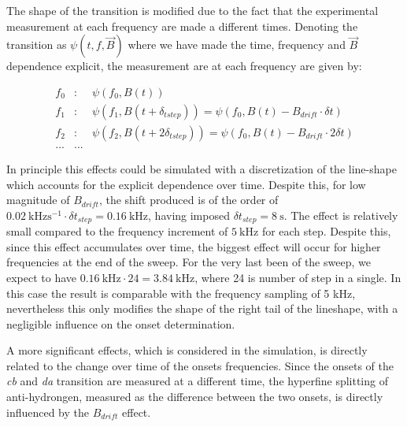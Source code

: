\documentclass[11pt,a4paper,oneside]{article}
\begin{document}
The shape of the transition  is modified due to the fact that the experimental measurement at each frequency are made a different times. Denoting the transition as $\psi(t,f,\vec{B})$ where we have made the time, frequency and $\vec{B}$ dependence explicit, the measurement are at each frequency are given by:

\begin{eqnarray*}
f_{0}& : &\psi(f_{0},B(t))   \\
f_{1}& : &\psi(f_{1},B(t + \delta_{tstep})) = \psi(f_{0},B(t) - B_{drift} \cdot \delta t) \\
f_{2}& : &\psi(f_{2},B(t + 2\delta_{tstep})) = \psi(f_{0},B(t) - B_{drift} \cdot 2 \delta t)\\
... & ...
\end{eqnarray*}

In principle this effects could be simulated with a discretization of the line-shape which accounts for the explicit dependence over time. Despite this, for low magnitude of $B_{drift}$, the shift produced is of the order of $\SI{0.02}{\kilo \hertz \second \tothe{-1}} \cdot \delta t_{step} = \SI{0.16}{\kilo \hertz}$, having imposed $\delta t_{step} =\SI{8}{\second}$. The effect is relatively small compared to the frequency increment of $\SI{5}{\kilo \hertz}$ for each step. Despite this, since this effect accumulates over time, the biggest effect will occur for higher frequencies at the end of the sweep. For the very last been of the sweep, we expect to have $ \SI{0.16}{\kilo \hertz} \cdot 24  = \SI{3.84}{\kilo \hertz} $, where 24 is number of step in a single. In this case the result is comparable with the frequency sampling of 5 kHz, nevertheless this only modifies the shape of the right tail of the lineshape, with a negligible influence on the onset determination.

A more significant effects, which is considered in the simulation, is directly related to the change over time of the onsets frequencies. Since the onsets of the \textit{cb} and \textit{da} transition are measured at a different time, the hyperfine splitting of anti-hydrongen, measured as the difference between the two onsets, is directly influenced by the $B_{drift}$ effect. 
\end{document}

